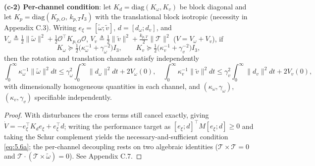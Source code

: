\begin{theorem}
\textbf{(c-2) Per-channel condition}: let $K_d=\mathrm{diag}(K_\omega,K_v)$ be block diagonal and let $K_p=\mathrm{diag}(K_{p,O},\,k_{p,T}I_3)$ with the translational block isotropic (necessity in Appendix C.3). Writing $e_\xi=[\tilde\omega;\tilde v]$, $d=[d_\omega;d_v]$, and $V_\omega\triangleq\tfrac12\|\tilde\omega\|^2+\tfrac12\mathcal O^\top K_{p,O}\mathcal O$, $V_v\triangleq\tfrac12\|\tilde v\|^2+\tfrac{k_{p,T}}2\|\mathcal T\|^2$ ($V=V_\omega+V_v$), if
\begin{equation}
K_\omega\succeq\tfrac12\bigl(\kappa_\omega^{-1}+\gamma_\omega^{-2}\bigr)I_3,
\qquad
K_v\succeq\tfrac12\bigl(\kappa_v^{-1}+\gamma_v^{-2}\bigr)I_3,
\tag{5.6b}\label{eq:5.6b}
\end{equation}
then the rotation and translation channels satisfy independently
\begin{equation}
\int_0^\infty\kappa_\omega^{-1}\|\tilde\omega\|^2dt\le\gamma_\omega^2\int_0^\infty\|d_\omega\|^2dt+2V_\omega(0),
\quad
\int_0^\infty\kappa_v^{-1}\|\tilde v\|^2dt\le\gamma_v^2\int_0^\infty\|d_v\|^2dt+2V_v(0),
\tag{5.6$'$}\label{eq:5.6p}
\end{equation}
with dimensionally homogeneous quantities in each channel, and $(\kappa_\omega,\gamma_\omega)$, $(\kappa_v,\gamma_v)$ specifiable independently.
\end{theorem}

\begin{proof}
With disturbances the cross terms still cancel exactly, giving $\dot V=-e_\xi^\top K_de_\xi+e_\xi^\top d$; writing the performance target as $[e_\xi;d]^\top M[e_\xi;d]\ge0$ and taking the Schur complement yields the necessary-and-sufficient condition \eqref{eq:5.6a}; the per-channel decoupling rests on two algebraic identities ($\mathcal T\times\mathcal T=0$ and $\mathcal T\cdot(\mathcal T\times\tilde\omega)=0$). See Appendix C.7.
\end{proof}

